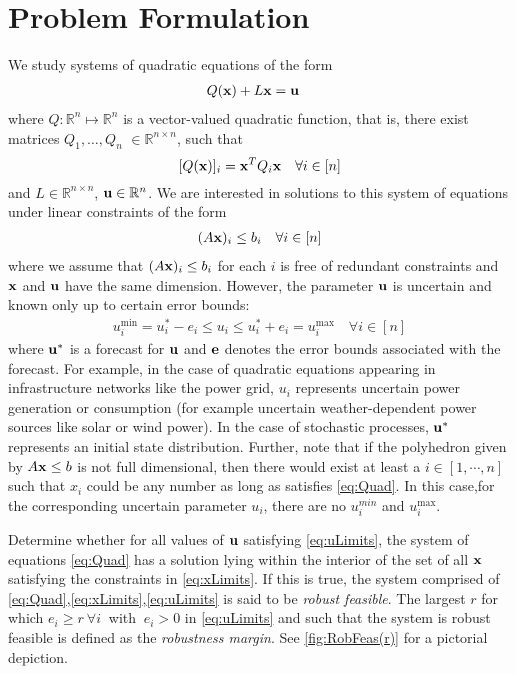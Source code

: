 \section{Problem Formulation} \label{sec:probform}  

We study systems of quadratic equations of the form
\begin{align}
& Q(\mathbf{x})+L\mathbf{x}=\mathbf{u}\label{eq:Quad}
\end{align}
where $Q: \mathbb{R}^n \mapsto \mathbb{R}^n$ is a vector-valued quadratic function, that is, there exist matrices $Q_1,\ldots,Q_n $ $\in \mathbb{R}^{n\times n}$, such that
\[[Q(\mathbf{x})]_i = \mathbf{x}^T Q_{i} \mathbf{x} \quad \forall i \in [n]\]
and $L \in \mathbb{R}^{n\times n}$, $\mathbf{u} \in \mathbb{R}^n$. 
We are interested in solutions to this system of equations under linear constraints of the form
\begin{align}
(A\mathbf{x})_i\leq b_i \quad \forall i \in [n]\label{eq:xLimits}
\end{align}
where we assume that $(A\mathbf{x})_i \leq b_i$ for each $i$ is free of redundant constraints and $\mathbf{x}$ and $\mathbf{u}$ have the same dimension.
However, the parameter $\mathbf{u}$ is uncertain and known only up to certain error bounds:
%
\begin{align}
u^{\min}_i=u_i^*-e_i \leq u_i \leq u_i^*+e_i=u^{\max}_i \quad \forall i \in [n] \label{eq:uLimits}
\end{align}
%
where $\mathbf{u}^*$ is a forecast for $\mathbf{u}$ and $\mathbf{e}$ denotes the error bounds associated with the forecast. 
For example, in the case of quadratic equations appearing in infrastructure networks like the power grid, $u_i$ represents uncertain power generation or consumption (for example uncertain weather-dependent power sources like solar or wind power). 
In the case of stochastic processes, $\mathbf{u}^*$ represents an initial state distribution. Further, note that if the polyhedron given by $A\mathbf{x} \leq b$ is not full dimensional, then there would exist at least a $i\in[1,\dotsb, n]$ such that $x_i$ could be any number as long as satisfies \eqref{eq:Quad}. In this case,for the corresponding uncertain parameter $u_i$, there are no $u_i^{min}$ and $u_i^{\max}$.

\begin{cdef}  \label{RobustDef}
  Determine whether for all values of $\mathbf{u}$ satisfying \eqref{eq:uLimits}, the system of equations \eqref{eq:Quad} has a solution lying within the interior of the set of all  $\mathbf{x}$ satisfying the constraints in \eqref{eq:xLimits}. 
  If this is true, the system comprised of \eqref{eq:Quad},\eqref{eq:xLimits},\eqref{eq:uLimits} is said to be \emph{robust feasible}. 
  The largest $r$ for which $e_i\geq r \ \forall i~$ with $~e_i>0$ in \eqref{eq:uLimits} and such that the system is robust feasible is defined as the \emph{robustness margin}. 
  See \cref{fig:RobFeas(r)} for a pictorial depiction. 
\end{cdef}

